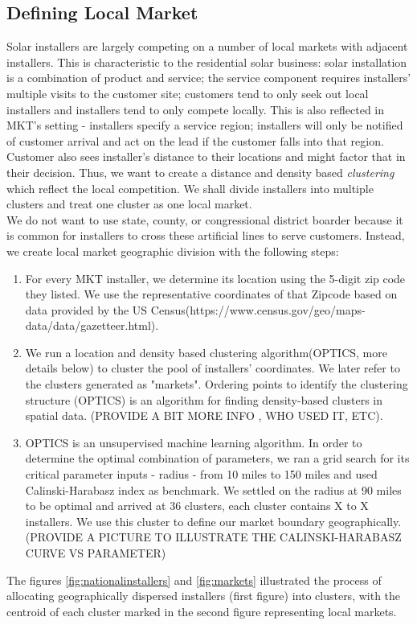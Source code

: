 \documentclass[msom,blindrev]{informs3}
\begin{document}
\subsection{Defining Local Market}
\label{defining_local_market}
Solar installers are largely competing on a number of local markets with adjacent installers.  This is characteristic to the residential solar business: solar installation is a combination of product and service; the service component requires installers' multiple visits to the customer site;  customers tend to only seek out local installers and installers tend to only compete locally. This is also reflected in MKT's setting - installers specify a service region; installers will only be notified of customer arrival and act on the lead if the customer falls into that region. Customer also sees installer's distance to their locations and might factor that in their decision. Thus, we want to create a distance and density based \textit{clustering} which reflect the local competition. We shall divide installers into multiple clusters and treat one cluster as one local market. \\
We do not want to use state, county, or congressional district boarder because it is common for installers to cross these artificial lines to serve customers. Instead, we create local market geographic division with the following steps:
\begin{enumerate}
	\item For every MKT installer, we determine its location using the 5-digit zip code they listed. We use the representative coordinates of that Zipcode based on data provided by the US Census(https://www.census.gov/geo/maps-data/data/gazetteer.html).
	\item  We run a location and density based clustering algorithm(OPTICS, more details below) to cluster the pool of installers' coordinates. We later refer to the clusters generated as "markets".  Ordering points to identify the clustering structure (OPTICS) is an algorithm for finding density-based clusters in spatial data. (PROVIDE A BIT MORE INFO , WHO USED IT, ETC).
	\item OPTICS is an unsupervised machine learning algorithm. In order to determine the optimal combination of parameters, we ran a grid search for its critical parameter inputs - radius - from 10 miles to 150 miles and used Calinski-Harabasz index as benchmark. We settled on the radius at 90 miles to be optimal and arrived at 36 clusters, each cluster contains X to X installers. We use this cluster to define our market boundary geographically. (PROVIDE A PICTURE TO ILLUSTRATE THE CALINSKI-HARABASZ CURVE VS PARAMETER)
\end{enumerate}
The figures \ref{fig:nationalinstallers} and \ref{fig:markets} illustrated the process of allocating geographically dispersed installers (first figure) into clusters, with the centroid of each cluster marked in the second figure representing local markets.
\end{document}
